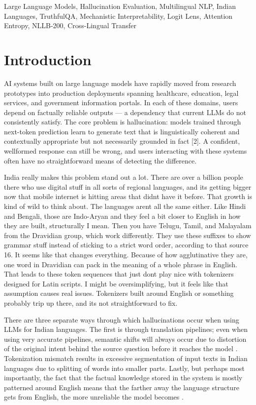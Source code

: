 \documentclass[conference]{IEEEtran}
\begin{document}
\begin{IEEEkeywords}
Large Language Models, Hallucination Evaluation, Multilingual 
NLP, Indian Languages, TruthfulQA, Mechanistic Interpretability, 
Logit Lens, Attention Entropy, NLLB-200, Cross-Lingual Transfer
\end{IEEEkeywords}

\section{Introduction}

AI systems built on large language models have rapidly
moved from research prototypes into production deployments
spanning healthcare, education, legal services, and government
information portals. In each of these domains, users depend on
factually reliable outputs — a dependency that current LLMs
do not consistently satisfy. The core problem is hallucination:
models trained through next-token prediction learn to generate
text that is linguistically coherent and contextually appropriate
but not necessarily grounded in fact [2]. A confident, wellformed response can still be wrong, and users interacting with
these systems often have no straightforward means of detecting
the difference.

India really makes this problem stand out a lot. There are over a billion people there who use digital stuff in all sorts of regional languages, and its getting bigger now that mobile internet is hitting areas that didnt have it before. That growth is kind of wild to think about. The languages arent all the same either. Like Hindi and Bengali, those are Indo-Aryan and they feel a bit closer to English in how they are built, structurally I mean. Then you have Telugu, Tamil, and Malayalam from the Dravidian group, which work differently. They use these suffixes to show grammar stuff instead of sticking to a strict word order, according to that source 16. It seems like that changes everything. Because of how agglutinative they are, one word in Dravidian can pack in the meaning of a whole phrase in English. That leads to these token sequences that just dont play nice with tokenizers designed for Latin scripts. I might be oversimplifying, but it feels like that assumption causes real issues. Tokenizers built around English or something probably trip up there, and its not straightforward to fix.

There are three separate ways through which hallucinations occur when using LLMs for
Indian languages. The first is through translation pipelines; even when using very accurate pipelines, semantic shifts will always
occur due to distortion of the original intent behind the source question before it reaches the model \cite{b17}. Tokenization mismatch
results in excessive segmentation of input texts in Indian languages due to splitting of words into smaller parts. Lastly, but perhaps most importantly, the fact that the
factual knowledge stored in the system is mostly patterned around English means that the farther away the language structure gets from English, the more unreliable the model becomes \cite{b19}.
\end{document}
